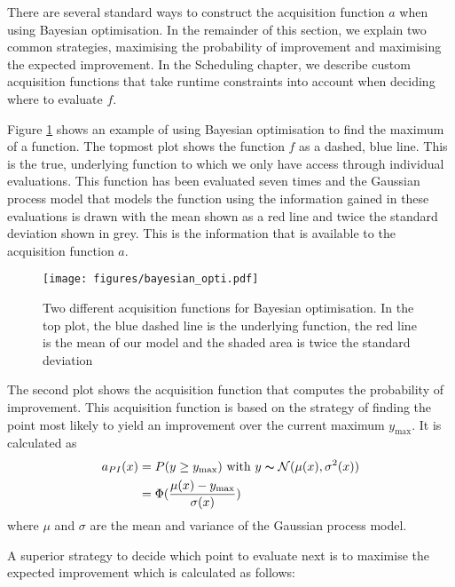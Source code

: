 \documentclass[a4paper,12pt,twoside,openright]{report}
\begin{document}
There are several standard ways to construct the acquisition function $a$ when using Bayesian optimisation. In the remainder of this section, we explain two common strategies, maximising the probability of improvement and maximising the expected improvement. In the Scheduling chapter, we describe custom acquisition functions that take runtime constraints into account when deciding where to evaluate $f$.

Figure \ref{bayesianopti} shows an example of using Bayesian optimisation to find the maximum of a function. The topmost plot shows the function $f$ as a dashed, blue line. This is the true, underlying function to which we only have access through individual evaluations. This function has been evaluated seven times and the Gaussian process model that models the function using the information gained in these evaluations is drawn with the mean shown as a red line and twice the standard deviation shown in grey. This is the information that is available to the acquisition function $a$.

\begin{figure}[p]
\centering
  \texttt{[image: figures/bayesian\_opti.pdf]}
  \caption{Two different acquisition functions for Bayesian optimisation. In the top plot, the blue dashed line is the underlying function, the red line is the mean of our model and the shaded area is twice the standard deviation}
  \label{bayesianopti}
\end{figure}
The second plot shows the acquisition function that computes the probability of improvement. This acquisition function is based on the strategy of finding the point most likely to yield an improvement over the current maximum $y_{\text{max}}$. It is calculated as
\begin{align}
a_{PI}(x) &= P(y \geq y_{\text{max}}) \text{\ with\ } y \thicksim \mathcal{N}(\mu(x),\sigma^2(x))\label{eq:pi_equation}\\
&=\Phi(\frac{\mu(x) - y_{\text{max}}}{\sigma(x)})
\end{align}
where $\mu$ and $\sigma$ are the mean and variance of the Gaussian process model.

A superior strategy to decide which point to evaluate next is to maximise the expected improvement which is calculated as follows:
\end{document}
